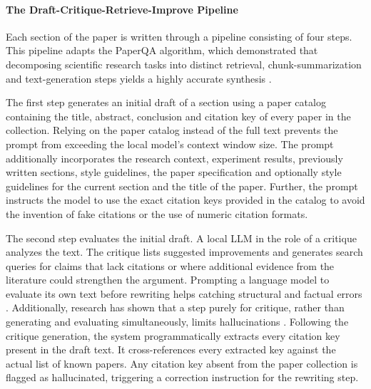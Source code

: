 \paragraph{The Draft-Critique-Retrieve-Improve Pipeline}
Each section of the paper is written through a pipeline consisting of four steps.
This pipeline adapts the PaperQA algorithm, which demonstrated that decomposing scientific research tasks into distinct retrieval, chunk-summarization and text-generation steps yields a highly accurate synthesis \cite{skarlinski2024languageagentsachievesuperhuman}.

The first step generates an initial draft of a section using a paper catalog containing the title, abstract, conclusion and citation key of every paper in the collection.
Relying on the paper catalog instead of the full text prevents the prompt from exceeding the local model's context window size.
The prompt additionally incorporates the research context, experiment results, previously written sections, style guidelines, the paper specification and optionally style guidelines for the current section and the title of the paper.
Further, the prompt instructs the model to use the exact citation keys provided in the catalog to avoid the invention of fake citations or the use of numeric citation formats.

The second step evaluates the initial draft.
A local LLM in the role of a critique analyzes the text.
The critique lists suggested improvements and generates search queries for claims that lack citations or where additional evidence from the literature could strengthen the argument.
Prompting a language model to evaluate its own text before rewriting helps catching structural and factual errors \cite{Madaan2023}.
Additionally, research has shown that a step purely for critique, rather than generating and evaluating simultaneously, limits hallucinations \cite{Wang2025NLE}.
Following the critique generation, the system programmatically extracts every citation key present in the draft text.
It cross-references every extracted key against the actual list of known papers.
Any citation key absent from the paper collection is flagged as hallucinated, triggering a correction instruction for the rewriting step.


